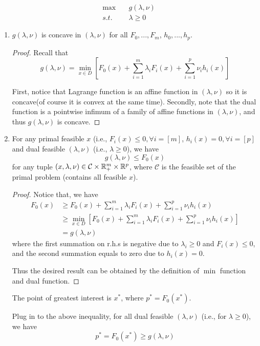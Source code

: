 \begin{align*}
	\max \quad&g(\lambda, \nu) \\
	s.t. \quad&\lambda \geq 0
\end{align*}
\begin{enumerate}
	
	\item $g(\lambda, \nu)$ is concave in $(\lambda, \nu)$ for all $F_0,...,F_m$, $h_0,...,h_p$.
	
	\begin{proof}
		Recall that
		$$g(\lambda, \nu) =\min_{x\in D}[F_0(x) + \sum^m_{i=1}\lambda_iF_i(x) + \sum^p_{i=1}\nu_ih_i(x) ]$$
		
		First, notice that Lagrange function is an affine function in $(\lambda, \nu)$ so it is concave(of course it is convex at the same time). Secondly, note that the dual function is a pointwise infimum of a family of affine functions in $(\lambda, \nu)$, and thus $g(\lambda, \nu)$ is concave.
	\end{proof}
	
	\item For any primal feasible $x$ (i.e., $F_i(x)\leq 0, \forall i = [m]$, $h_i(x)= 0,\forall i = [p]$ and dual feasible $(\lambda, \nu)$ (i.e., $\lambda \geq 0$), we have
	$$g(\lambda, \nu)\leq F_0(x)$$
	for any tuple $(x, \lambda, \nu) \in \mathcal{C}\times \mathbb{R}^m_+\times \mathbb{R}^p$, where $\mathcal{C}$ is the feasible set of the primal problem (contains all feasible $x$).
	
	\begin{proof}
		Notice that, we have
		\begin{align*}
			F_0(x) &\geq F_0(x) + \sum^m_{i=1}\lambda_iF_i(x) + \sum^p_{i=1}\nu_ih_i(x)\\
			&\geq \min_{x\in D} [F_0(x) + \sum^m_{i=1}\lambda_iF_i(x) + \sum^p_{i=1}\nu_ih_i(x)] \\
			&= g(\lambda, \nu)
		\end{align*}
		where the first summation on r.h.s is negative due to $\lambda_i\geq 0$ and $F_i(x)\leq 0$, and the second summation equals to zero due to $h_i(x)=0$. 
		
		Thus the desired result can be obtained by the definition of $\min$ function and dual function.
	\end{proof}
	
	The point of greatest interest is $x^*$, where $p^* = F_0(x^*)$.
	
	Plug in to the above inequality, for all dual feasible $(\lambda, \nu)$ (i.e., for $\lambda \geq 0$), we have
	\begin{equation*}
		p^* = F_0(x^*) \geq g(\lambda, \nu)
	\end{equation*}
	

\end{enumerate}
